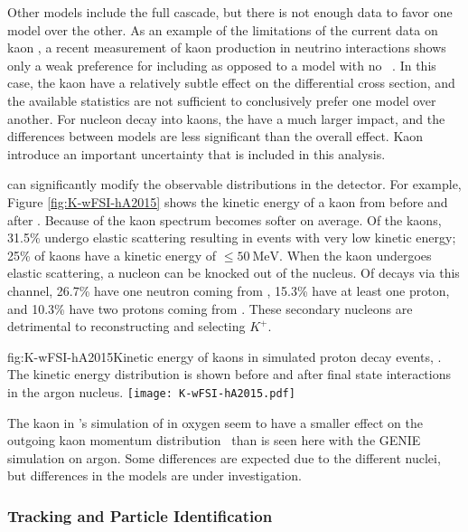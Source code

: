 Other  models include the full cascade, but there is not enough data to favor one model over the other.  As an example of the limitations of the current data on kaon , a recent measurement of kaon production in neutrino interactions shows only a weak preference for including  as opposed to a model with no ~\cite{Marshall:2016rrn}.  In this case, the kaon  have a relatively subtle effect on the differential cross section, and the available statistics are not sufficient to conclusively prefer one model over another.  For nucleon decay into kaons, the  have a much larger impact, and the differences between models are less significant than the overall effect.  Kaon  introduce an important uncertainty that is included in this analysis.

 can significantly modify the observable distributions in the detector.  For example, Figure \ref{fig:K-wFSI-hA2015} shows the kinetic energy of a kaon from \ptoknubar before and after . Because of  the kaon spectrum becomes softer on average. Of the kaons, \num{31.5}\%  undergo elastic scattering resulting in events with very low kinetic energy;  \num{25}\% of kaons have a kinetic energy of $\le\SI{50}{\MeV}$. When the kaon undergoes elastic scattering, a nucleon can be knocked out of the nucleus. Of decays via this channel, \num{26.7}\%  have one neutron coming from , \num{15.3}\% have at least one proton, and \num{10.3}\% have two protons coming from . These secondary nucleons are detrimental to reconstructing and selecting  $K^{+}$.

\begin{dunefigure}{fig:K-wFSI-hA2015}{Kinetic energy of kaons in simulated proton decay events, \ptoknubar.  The kinetic energy distribution is shown before and after final state interactions in the argon nucleus.}
\texttt{[image: K-wFSI-hA2015.pdf]}
\end{dunefigure}

The kaon  in \superk's simulation of \ptoknubar in oxygen seem to have a smaller effect on the outgoing kaon momentum distribution~\cite{Abe:2014mwa} than is seen here with the GENIE simulation on argon.  Some differences are expected due to the different nuclei, but differences in the  models are under investigation.

\subsubsection{Tracking and Particle Identification}
\label{sec:event-reconstruction}

